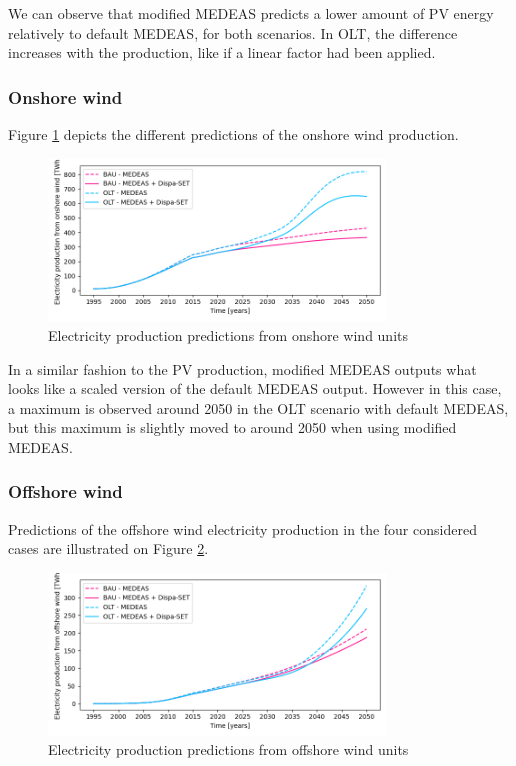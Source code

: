 We can observe that modified MEDEAS predicts a lower amount of PV energy relatively to default MEDEAS, for both scenarios. In OLT, the difference increases with the production, like if a linear factor had been applied.

\subsubsection{Onshore wind}

Figure \ref{fig:electricity-production-onshore} depicts the different predictions of the onshore wind production.

\begin{figure}[h]
    \centering
    \includegraphics[width=0.8\textwidth]{resources/images/electricity-production-onshore.png}
    \caption{Electricity production predictions from onshore wind units}
    \label{fig:electricity-production-onshore}
\end{figure}

In a similar fashion to the PV production, modified MEDEAS outputs what looks like a scaled version of the default MEDEAS output. However in this case, a maximum is observed around 2050 in the OLT scenario with default MEDEAS, but this maximum is slightly moved to around 2050 when using modified MEDEAS. 

\subsubsection{Offshore wind}

Predictions of the offshore wind electricity production in the four considered cases are illustrated on Figure \ref{fig:electricity-production-offshore}.

\begin{figure}[h]
    \centering
    \includegraphics[width=0.8\textwidth]{resources/images/electricity-production-offshore.png}
    \caption{Electricity production predictions from offshore wind units}
    \label{fig:electricity-production-offshore}
\end{figure}

